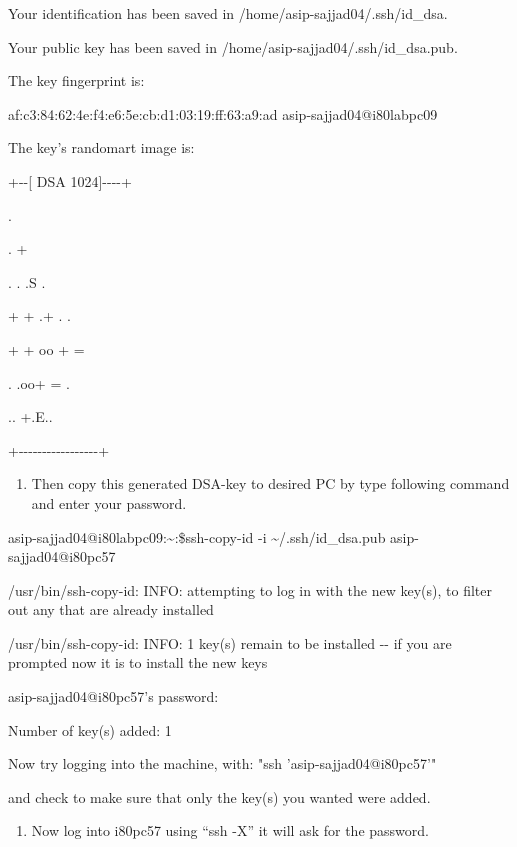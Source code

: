 \documentclass[
]{article}
\begin{document}
Your identification has been saved in /home/asip-sajjad04/.ssh/id\_dsa.

Your public key has been saved in /home/asip-sajjad04/.ssh/id\_dsa.pub.

The key fingerprint is:

af:c3:84:62:4e:f4:e6:5e:cb:d1:03:19:ff:63:a9:ad asip-sajjad04@i80labpc09

The key's randomart image is:

+-\/-{[} DSA 1024{]}-\/-\/-\/-+

\textbar{} \textbar{}

\textbar{} \textbar{}

\textbar{} . \textbar{}

\textbar{} . + \textbar{}

\textbar{} . . .S . \textbar{}

\textbar{} + + .+ . . \textbar{}

\textbar{} + + oo + = \textbar{}

\textbar{} . .oo+ = . \textbar{}

\textbar{} .. +.E.. \textbar{}

+-\/-\/-\/-\/-\/-\/-\/-\/-\/-\/-\/-\/-\/-\/-\/-\/-+

\begin{enumerate}
\def\labelenumi{\arabic{enumi}.}
\setcounter{enumi}{10}
\item
  Then copy this generated DSA-key to desired PC by type following
  command and enter your password.
\end{enumerate}

asip-sajjad04@i80labpc09:\textasciitilde:\$ssh-copy-id -i
\textasciitilde/.ssh/id\_dsa.pub asip-sajjad04@i80pc57

/usr/bin/ssh-copy-id: INFO: attempting to log in with the new key(s), to
filter out any that are already installed

/usr/bin/ssh-copy-id: INFO: 1 key(s) remain to be installed -\/- if you
are prompted now it is to install the new keys

asip-sajjad04@i80pc57's password:

Number of key(s) added: 1

Now try logging into the machine, with: "ssh 'asip-sajjad04@i80pc57'"

and check to make sure that only the key(s) you wanted were added.

\begin{enumerate}
\def\labelenumi{\arabic{enumi}.}
\setcounter{enumi}{11}
\item
  Now log into i80pc57 using ``ssh -X'' it will ask for the password.
\end{enumerate}
\end{document}
